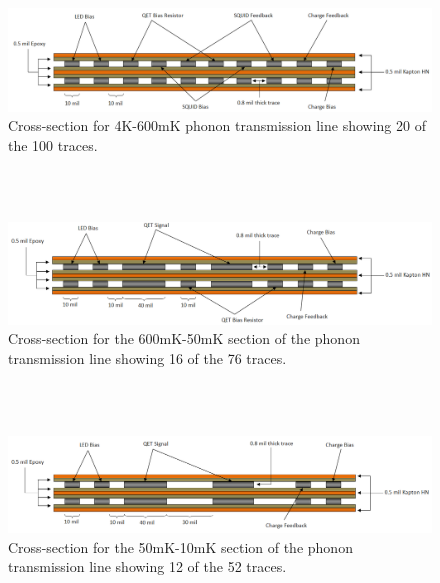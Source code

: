 \documentclass{article}
\begin{document}
\newpage

\begin{figure}[h]
\centering
\includegraphics[width = .9\textwidth]{4K_600mK_diagram.png}
\caption{Cross-section for 4K-600mK phonon transmission line showing 20 of the 100 traces.}
\end{figure}
~\\
~\\
\begin{figure}[h]
\centering
\includegraphics[width = .9\textwidth]{600mK_50mK_diagram.png}
\caption{Cross-section for the 600mK-50mK section of the phonon transmission line showing 16 of the 76 traces.}
\end{figure}
~\\
~\\
\begin{figure}[h]
\centering
\includegraphics[width = .9\textwidth]{50mK_10mK_diagram.png}
\caption{Cross-section for the 50mK-10mK section of the phonon transmission line showing 12 of the 52 traces.}
\end{figure}

\newpage
\end{document}

